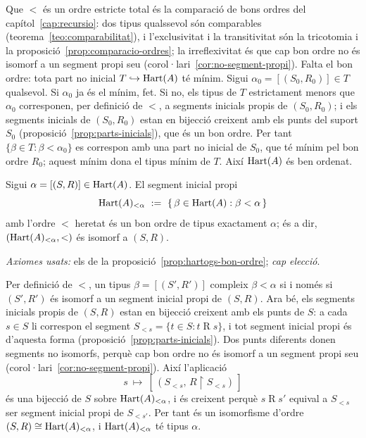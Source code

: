 \begin{prova}
Que \(<\) és un ordre estricte total és la comparació de bons ordres del
capítol~\ref{cap:recursio}: dos tipus qualssevol són comparables
(teorema~\ref{teo:comparabilitat}), i l'exclusivitat i la transitivitat són
la tricotomia i la proposició~\ref{prop:comparacio-ordres}; la
irreflexivitat és que cap bon ordre no és isomorf a un segment propi seu
(corol·lari~\ref{cor:no-segment-propi}). Falta el bon ordre: tota part no
inicial \(T\hookrightarrow\operatorname{Hart}(A)\) té mínim. Sigui
\(\alpha_0=[(S_0,R_0)]\in T\) qualsevol. Si \(\alpha_0\) ja és el mínim, fet.
Si no, els tipus de \(T\) estrictament menors que \(\alpha_0\) corresponen,
per definició de \(<\), a segments inicials propis de \((S_0,R_0)\); i els
segments inicials de \((S_0,R_0)\) estan en bijecció creixent amb els punts
del suport \(S_0\) (proposició~\ref{prop:parts-inicials}), que és un bon
ordre. Per tant \(\{\beta\in T:\beta<\alpha_0\}\) es correspon amb una part no
inicial de \(S_0\), que té mínim pel bon ordre \(R_0\); aquest mínim dona el
tipus mínim de \(T\). Així \(\operatorname{Hart}(A)\) és ben
ordenat.
\end{prova}

\begin{lema}\label{lema:segment-tipus}
Sigui \(\alpha=[(S,R)]\in\operatorname{Hart}(A)\). El segment inicial propi
\[
\Hart(A)_{<\alpha}\ :=\ \{\,\beta\in\Hart(A):\beta<\alpha\,\}
\]
amb l'ordre \(<\) heretat és un bon ordre de tipus exactament \(\alpha\); és a
dir, \((\operatorname{Hart}(A)_{<\alpha},<)\) és isomorf a \((S,R)\).\par
\emph{Axiomes usats:} els de la proposició~\ref{prop:hartogs-bon-ordre};
\emph{cap elecció}.
\end{lema}

\begin{prova}
Per definició de \(<\), un tipus \(\beta=[(S',R')]\) compleix \(\beta<\alpha\)
si i només si \((S',R')\) és isomorf a un segment inicial propi de \((S,R)\).
Ara bé, els segments inicials propis de \((S,R)\) estan en bijecció creixent
amb els punts de \(S\): a cada \(s\in S\) li correspon el segment
\(S_{<s}=\{t\in S: t\mathrel R s\}\), i tot segment inicial propi és d'aquesta
forma (proposició~\ref{prop:parts-inicials}). Dos punts diferents donen
segments no isomorfs, perquè cap bon ordre no és isomorf a un segment propi
seu (corol·lari~\ref{cor:no-segment-propi}). Així l'aplicació
\[
s\ \longmapsto\ [\,(S_{<s},\,R\!\restriction\!S_{<s})\,]
\]
és una bijecció de \(S\) sobre \(\operatorname{Hart}(A)_{<\alpha}\), i és creixent perquè
\(s\mathrel R s'\) equival a \(S_{<s}\) ser segment inicial propi de
\(S_{<s'}\). Per tant és un isomorfisme d'ordre \((S,R)\cong
\operatorname{Hart}(A)_{<\alpha}\), i \(\operatorname{Hart}(A)_{<\alpha}\) té tipus \(\alpha\).
\end{prova}

